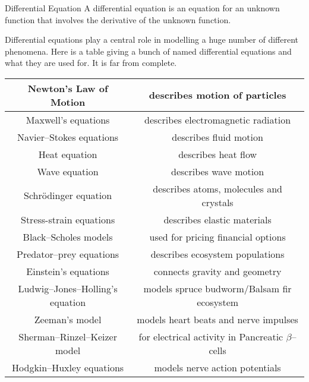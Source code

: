 \begin{frame}\begin{block}{Differential Equation}
A \alert{differential equation} is an equation for an unknown function that
involves the derivative of the unknown function.
\end{block} \pause
 Differential equations
play a central role in modelling a huge number of different phenomena.
Here is a table giving a bunch of named differential equations and what
they are used for. It is far from complete.

\begin{center}\tiny
\renewcommand{\arraystretch}{1.4}
     \begin{tabular}{|c|c|}
        \hline
  Newton's Law of Motion
      & describes motion of particles \\ \hline
  Maxwell's equations
      &describes electromagnetic radiation \\ \hline
  Navier--Stokes equations
      &describes fluid motion \\ \hline
  Heat equation
      &describes heat flow \\ \hline
  Wave equation
      &describes wave motion \\ \hline
  Schr\"odinger equation
      &describes atoms, molecules and crystals \\ \hline
  Stress-strain equations
      &describes elastic materials \\ \hline
  Black--Scholes models
      &used for pricing financial options \\ \hline
  Predator--prey equations
      &describes ecosystem populations  \\ \hline
  Einstein's equations
      &connects gravity and geometry  \\ \hline
  Ludwig--Jones--Holling's equation
      &models spruce budworm/Balsam fir ecosystem  \\ \hline
  Zeeman's model
      &models heart beats and nerve impulses \\ \hline
  Sherman--Rinzel--Keizer model
      &for electrical activity in Pancreatic $\beta$--cells  \\ \hline
  Hodgkin--Huxley equations
      &models nerve action potentials  \\
  \hline
     \end{tabular}
\renewcommand{\arraystretch}{1.0}
\end{center}
\end{frame}

